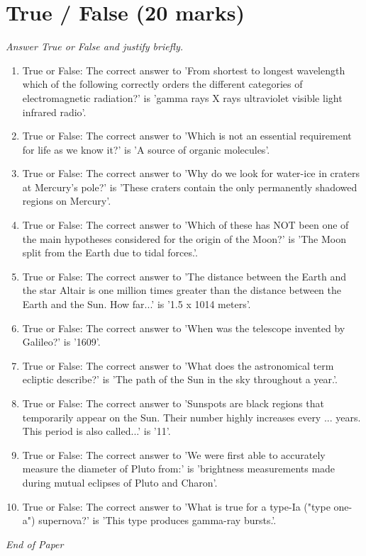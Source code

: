 \documentclass[12pt]{article}
\begin{document}
\section*{True / False (20 marks)}
\textit{Answer True or False and justify briefly.}
\begin{enumerate}[label=\arabic*.]
\item True or False: The correct answer to 'From shortest to longest wavelength which of the following correctly orders the different categories of electromagnetic radiation?' is 'gamma rays X rays ultraviolet visible light infrared radio'.
\item True or False: The correct answer to 'Which is not an essential requirement for life as we know it?' is 'A source of organic molecules'.
\item True or False: The correct answer to 'Why do we look for water-ice in craters at Mercury's pole?' is 'These craters contain the only permanently shadowed regions on Mercury'.
\item True or False: The correct answer to 'Which of these has NOT been one of the main hypotheses considered for the origin of the Moon?' is 'The Moon split from the Earth due to tidal forces.'.
\item True or False: The correct answer to 'The distance between the Earth and the star Altair is one million times greater than the distance between the Earth and the Sun. How far...' is '1.5 x 1014 meters'.
\item True or False: The correct answer to 'When was the telescope invented by Galileo?' is '1609'.
\item True or False: The correct answer to 'What does the astronomical term ecliptic describe?' is 'The path of the Sun in the sky throughout a year.'.
\item True or False: The correct answer to 'Sunspots are black regions that temporarily appear on the Sun. Their number highly increases every ... years. This period is also called...' is '11'.
\item True or False: The correct answer to 'We were first able to accurately measure the diameter of Pluto from:' is 'brightness measurements made during mutual eclipses of Pluto and Charon'.
\item True or False: The correct answer to 'What is true for a type-Ia ("type one-a") supernova?' is 'This type produces gamma-ray bursts.'.
\end{enumerate}

\vfill
\noindent\textit{End of Paper}
\end{document}

